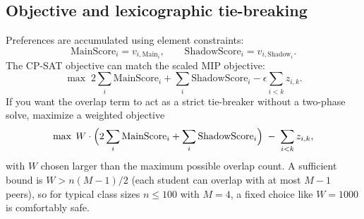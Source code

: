 \documentclass[12pt]{article}
\begin{document}
	\subsection{Objective and lexicographic tie-breaking}
	Preferences are accumulated using element constraints:
	\[
		\text{MainScore}_i = v_{i,\text{Main}_i},\qquad \text{ShadowScore}_i = v_{i,\text{Shadow}_i}.
	\]
	The CP-SAT objective can match the scaled MIP objective:
	\[
		\max\; 2\sum_i \text{MainScore}_i + \sum_i \text{ShadowScore}_i - \epsilon \sum_{i<k} z_{i,k}.
	\]
	If you want the overlap term to act as a strict tie-breaker without a two-phase solve, maximize a weighted objective
	\[
		\max\; W \cdot \Bigl(2\sum_i \text{MainScore}_i + \sum_i \text{ShadowScore}_i\Bigr)\;-\;\sum_{i<k} z_{i,k},
	\]
	with $W$ chosen larger than the maximum possible overlap count. A sufficient bound is $W > n(M-1)/2$ (each student can overlap with at most $M-1$ peers), so for typical class sizes $n\le 100$ with $M=4$, a fixed choice like $W=1000$ is comfortably safe.
\end{document}
